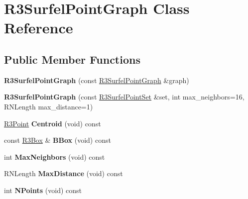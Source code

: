 \hypertarget{class_r3_surfel_point_graph}{}\section{R3\+Surfel\+Point\+Graph Class Reference}
\label{class_r3_surfel_point_graph}
\subsection*{Public Member Functions}
\begin{DoxyCompactItemize}
\item 
{\bfseries R3\+Surfel\+Point\+Graph} (const \hyperlink{class_r3_surfel_point_graph}{R3\+Surfel\+Point\+Graph} \&graph)\hypertarget{class_r3_surfel_point_graph_a15bc00a7ab19e3b188f4c5510ebbba0f}{}\label{class_r3_surfel_point_graph_a15bc00a7ab19e3b188f4c5510ebbba0f}

\item 
{\bfseries R3\+Surfel\+Point\+Graph} (const \hyperlink{class_r3_surfel_point_set}{R3\+Surfel\+Point\+Set} \&set, int max\+\_\+neighbors=16, R\+N\+Length max\+\_\+distance=1)\hypertarget{class_r3_surfel_point_graph_a724f57279be5382f0fa55aa251d7d7b7}{}\label{class_r3_surfel_point_graph_a724f57279be5382f0fa55aa251d7d7b7}

\item 
\hyperlink{class_r3_point}{R3\+Point} {\bfseries Centroid} (void) const \hypertarget{class_r3_surfel_point_graph_a6ac2b48f66a61e5d9b67ec60f91a1ea4}{}\label{class_r3_surfel_point_graph_a6ac2b48f66a61e5d9b67ec60f91a1ea4}

\item 
const \hyperlink{class_r3_box}{R3\+Box} \& {\bfseries B\+Box} (void) const \hypertarget{class_r3_surfel_point_graph_a0b6a0c8789d64858fb830a41d5b7c12c}{}\label{class_r3_surfel_point_graph_a0b6a0c8789d64858fb830a41d5b7c12c}

\item 
int {\bfseries Max\+Neighbors} (void) const \hypertarget{class_r3_surfel_point_graph_a8d9fdbf5815e0567f0de21d26430b62c}{}\label{class_r3_surfel_point_graph_a8d9fdbf5815e0567f0de21d26430b62c}

\item 
R\+N\+Length {\bfseries Max\+Distance} (void) const \hypertarget{class_r3_surfel_point_graph_a93887396d304b38714d2f9f0bbf50af0}{}\label{class_r3_surfel_point_graph_a93887396d304b38714d2f9f0bbf50af0}

\item 
int {\bfseries N\+Points} (void) const \hypertarget{class_r3_surfel_point_graph_ad352a6a2ba9505c6d6c23bab7be79092}{}\label{class_r3_surfel_point_graph_ad352a6a2ba9505c6d6c23bab7be79092}


\end{DoxyCompactItemize}
